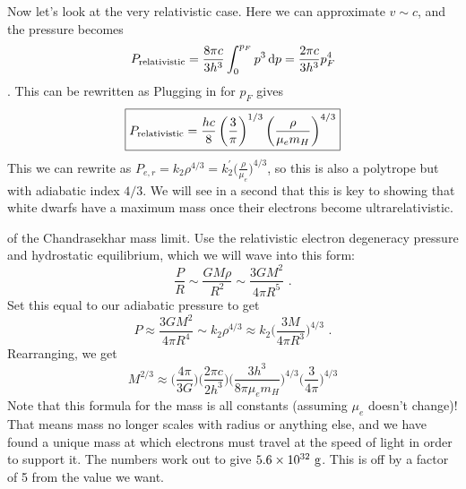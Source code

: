 \begin{enumerate}
      Now let's look at the very relativistic case. Here we can approximate $v \sim c$, and the pressure becomes
      \begin{dmath*}
      P_{\rm relativistic} = \frac{8\pi c}{3h^3}\int^{p_F}_0 p^3\,\d p \nolinebreak
                           = \frac{2\pi c}{3h^3}p_F^4
      \end{dmath*}.
      This can be rewritten as
      Plugging in for $p_F$ gives
      \begin{dmath}\boxed{
      P_{\rm relativistic} = \frac{hc}{8}\left(\frac{3}{\pi}\right)^{1/3}\left(\frac{\rho}{\mu_em_H}\right)^{4/3}
      }\end{dmath}
      This we can rewrite as $P_{e,r} = k_2 \rho^{4/3} = k_2^\prime \biggl(\frac{\rho}{\mu_e}\biggr)^{4/3}$, so this is also a polytrope but with adiabatic index $4/3$. We will see in a second that this is key to showing that white dwarfs have a maximum mass once their electrons become ultrarelativistic.
      
       of the Chandrasekhar mass limit.
      Use the relativistic electron degeneracy pressure and hydrostatic equilibrium, which we will wave into this form:
      \begin{equation}
      \frac{P}{R} \sim \frac{G M \rho}{R^2} \sim \frac{3 G M^2}{4 \pi R^5}\,\,.
      \end{equation}
      Set this equal to our adiabatic pressure to get
      \begin{equation}
      P \approx \frac{3 G M^2}{4 \pi R^4} \sim k_2 \rho^{4/3} \approx k_2 \biggl(\frac{3 M}{4 \pi R^3}\biggr)^{4/3}\,\,.
      \end{equation}
      Rearranging, we get
      \begin{equation}
      M^{2/3} \approx \biggl(\frac{4\pi}{3 G} \biggr)\biggl(\frac{2\pi c}{2 h^3} \biggr)\biggl(\frac{3 h^3}{8 \pi \mu_e m_H} \biggr)^{4/3} \biggl(\frac{3}{4 \pi} \biggr)^{4/3}
      \end{equation}
      Note that this formula for the mass is all constants (assuming $\mu_e$ doesn't change)! That means mass no longer scales with radius or anything else, and we have found a unique mass at which electrons must travel at the speed of light in order to support it. The numbers work out to give $5.6 \times 10^{32}~{\rm g}$. This is off by a factor of 5 from the value we want.


\end{enumerate}
